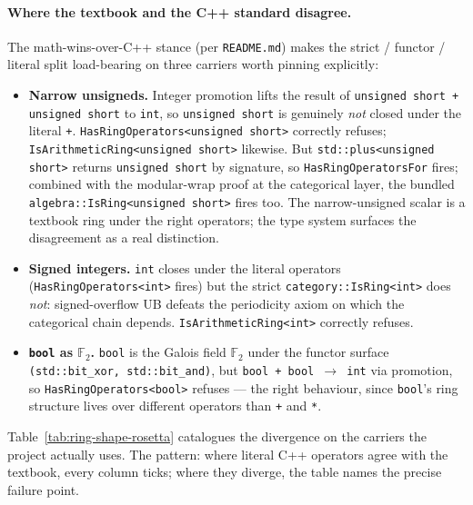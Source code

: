 \documentclass[11pt, a4paper]{report}
\begin{document}
\paragraph{Where the textbook and the C++ standard disagree.} The math-wins-over-C++ stance (per \texttt{README.md}) makes the strict / functor / literal split load-bearing on three carriers worth pinning explicitly:

\begin{itemize}
  \item \textbf{Narrow unsigneds.} Integer promotion lifts the result of \texttt{unsigned short + unsigned short} to \texttt{int}, so \texttt{unsigned short} is genuinely \emph{not} closed under the literal \texttt{+}. \texttt{HasRingOperators<unsigned short>} correctly refuses; \texttt{IsArithmeticRing<unsigned short>} likewise. But \texttt{std::plus<unsigned short>} returns \texttt{unsigned short} by signature, so \texttt{HasRingOperatorsFor} fires; combined with the modular-wrap proof at the categorical layer, the bundled \texttt{algebra::IsRing<unsigned short>} fires too. The narrow-unsigned scalar is a textbook ring under the right operators; the type system surfaces the disagreement as a real distinction.
  \item \textbf{Signed integers.} \texttt{int} closes under the literal operators (\texttt{HasRingOperators<int>} fires) but the strict \texttt{category::IsRing<int>} does \emph{not}: signed-overflow UB defeats the periodicity axiom on which the categorical chain depends. \texttt{IsArithmeticRing<int>} correctly refuses.
  \item \textbf{\texttt{bool} as $\mathbb{F}_2$.} \texttt{bool} is the Galois field $\mathbb{F}_2$ under the functor surface \texttt{(std::bit\_xor, std::bit\_and)}, but \texttt{bool + bool $\to$ int} via promotion, so \texttt{HasRingOperators<bool>} refuses --- the right behaviour, since \texttt{bool}'s ring structure lives over different operators than \texttt{+} and \texttt{*}.
\end{itemize}

Table~\ref{tab:ring-shape-rosetta} catalogues the divergence on the carriers the project actually uses. The pattern: where literal C++ operators agree with the textbook, every column ticks; where they diverge, the table names the precise failure point.
\end{document}
